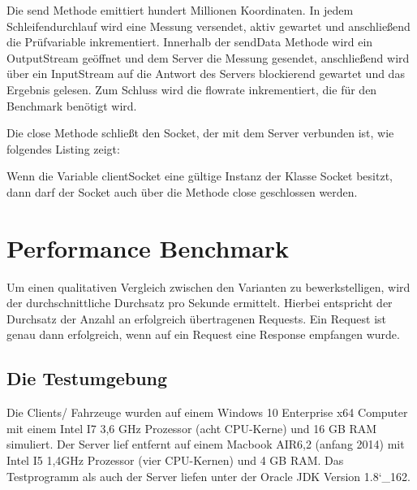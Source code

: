 
\clearpage


Die send Methode emittiert hundert Millionen Koordinaten. In jedem Schleifendurchlauf wird eine Messung versendet, aktiv gewartet und anschließend die Prüfvariable inkrementiert. Innerhalb der sendData Methode wird ein OutputStream geöffnet und dem Server die Messung gesendet, anschließend wird über ein InputStream auf die Antwort des Servers blockierend gewartet und das Ergebnis gelesen. Zum Schluss wird die flowrate inkrementiert, die für den Benchmark benötigt wird.

Die close Methode schließt den Socket, der mit dem Server verbunden ist, wie folgendes Listing zeigt:



Wenn die Variable clientSocket eine gültige Instanz der Klasse Socket besitzt, dann darf der Socket auch über die Methode close geschlossen werden.

\section{Performance Benchmark}
\label{sec:benchmark}
Um einen qualitativen Vergleich zwischen den Varianten zu bewerkstelligen, wird der durchschnittliche Durchsatz pro Sekunde ermittelt. Hierbei entspricht der Durchsatz der Anzahl an erfolgreich übertragenen Requests. Ein Request ist genau dann erfolgreich, wenn auf ein Request eine Response empfangen wurde.

\subsection{Die Testumgebung}
Die Clients/ Fahrzeuge wurden auf einem Windows 10 Enterprise x64 Computer mit einem Intel I7 3,6 GHz Prozessor (acht CPU-Kerne) und 16 GB RAM simuliert. Der Server lief entfernt auf einem Macbook AIR6,2 (anfang 2014) mit Intel I5 1,4GHz Prozessor (vier CPU-Kernen) und 4 GB RAM. Das Testprogramm als auch der Server liefen unter der Oracle JDK Version 1.8\char`_162.

